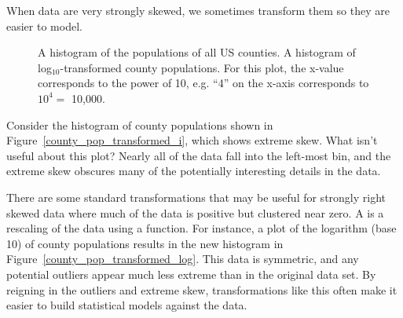 When data are very strongly skewed, we sometimes transform
them so they are easier to model.

\begin{figure}[ht]
\centering
{}
\caption{ A histogram of
  the populations of all US counties.
   A histogram of
  log$_{10}$-transformed county populations.
  For this plot, the x-value corresponds to the power
  of 10, e.g. ``4'' on the x-axis corresponds to $10^4 =$ 10,000.}
\label{county_pop_transformed}
\end{figure}

\begin{example}{Consider the histogram of county populations
    shown in Figure~\ref{county_pop_transformed_i},
    which shows extreme skew.
    What isn't useful about this plot?}
  Nearly all of the data fall into the left-most bin,
  and the extreme skew obscures many of the potentially
  interesting details in the data.
\end{example}

There are some standard transformations that may be
useful for strongly right skewed data where much of the
data is positive but clustered near zero.
A  is a rescaling of the data
using a function.
For instance, a plot of the logarithm (base 10) of
county populations results in the new histogram in
Figure~\ref{county_pop_transformed_log}.
This data is symmetric, and any potential outliers
appear much less extreme than in the original data set.
By reigning in the outliers and extreme skew,
transformations like this often make it easier to build
statistical models against the data.

